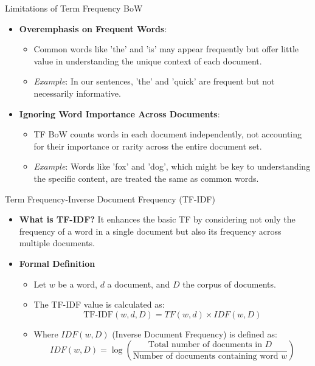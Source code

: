 \documentclass{beamer}
\newenvironment{stepitemize}{\begin{itemize}[<+->]}{\end{itemize} }
\begin{document}
\begin{frame}{Limitations of Term Frequency BoW}

\begin{stepitemize}
  \item \textbf{Overemphasis on Frequent Words}:
    \begin{itemize}
      \item Common words like 'the' and 'is' may appear frequently but offer little value in understanding the unique context of each document.
      \item \textit{Example}: In our sentences, 'the' and 'quick' are frequent but not necessarily informative.
    \end{itemize}
\vspace{0.5em}
  \item \textbf{Ignoring Word Importance Across Documents}:
    \begin{itemize}
      \item TF BoW counts words in each document independently, not accounting for their importance or rarity across the entire document set.
      \item \textit{Example}: Words like 'fox' and 'dog', which might be key to understanding the specific content, are treated the same as common words.
    \end{itemize}
\end{stepitemize}
\end{frame}

\begin{frame}{Term Frequency-Inverse Document Frequency (TF-IDF)}
\begin{stepitemize}

\item \textbf{What is TF-IDF?}
\newline
It enhances the basic TF by considering not only the frequency of a word in a single document but also its frequency across multiple documents.

\item \textbf{Formal Definition}
\begin{itemize}
  \item Let \( w \) be a word, \( d \) a document, and \( D \) the corpus of documents.
  \item The TF-IDF value is calculated as:
  \[ \text{TF-IDF}(w, d, D) = TF(w, d) \times IDF(w, D) \]
  \item Where \( IDF(w, D) \) (Inverse Document Frequency) is defined as:
  \[ IDF(w, D) = \log \left(\frac{\text{Total number of documents in } D}{\text{Number of documents containing word } w}\right) \]
\end{itemize}
\end{stepitemize}
\end{frame}
\end{document}
